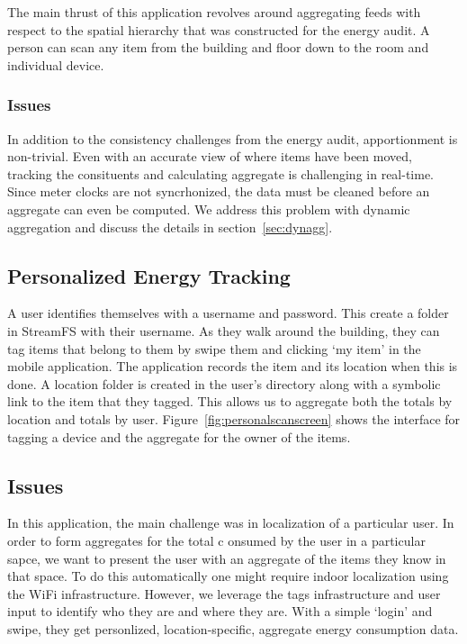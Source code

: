 The main thrust of this application revolves around aggregating feeds with respect to the spatial hierarchy that was
constructed for the energy audit.  A person can scan any item from the building and floor down to the room
and individual device.

\subsubsection{Issues}
In addition to the consistency challenges from the energy audit, apportionment is non-trivial.  Even with an accurate
view of where items have been moved, tracking the consituents and calculating aggregate is challenging in real-time.
Since meter clocks are not syncrhonized, the data must be cleaned before an aggregate can even be computed.
We address this problem with dynamic aggregation and discuss the details in section~\ref{sec:dynagg}.

\subsection{Personalized Energy Tracking}
A user identifies themselves with a username and password.  This create a folder in StreamFS with their username.  As they
walk around the building, they can tag items that belong to them by swipe them and clicking `my item' in the mobile
application.  The application records the item and its location when this is done.  A location folder is created
in the user's directory along with a symbolic link to the item that they tagged.  This allows us to aggregate both the totals
by location and totals by user.  Figure~\ref{fig:personalscanscreen} shows the interface for tagging a device 
and the aggregate for the owner of the items.


\subsection{Issues}
In this application, the main challenge was in localization of a particular user.  In order to form aggregates for the total c
onsumed by the user in a particular sapce, we want to present the user with an aggregate of the items they know in that space.  
To do this automatically one might require indoor localization using the WiFi infrastructure.  However, we leverage the tags infrastructure
and user input to identify who they are and where they are.  With a simple `login' and swipe, they get personlized,
location-specific, aggregate energy consumption data.

